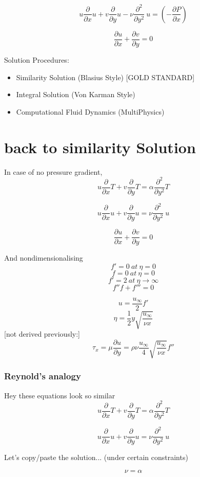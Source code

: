 \documentclass[11pt]{article}
\begin{document}
$$u  \frac{\partial}{\partial x } u + v  \frac{\partial}{\partial y} u -  \nu  \frac{\partial^2}{\partial y^2} \ u  =  ( -  \frac{\partial P}{\partial x} )$$

$$\frac{\partial u}{\partial x} + \frac{\partial v}{\partial y} = 0$$

Solution Procedures:
\begin{itemize}
\item Similarity Solution (Blasius Style) [GOLD STANDARD]
\item Integral Solution (Von Karman Style)
\item Computational Fluid Dynamics (MultiPhysics) 
\end{itemize}

\section{back to similarity Solution}

In case of no pressure gradient,
$$ u \frac{\partial}{\partial x} T + v \frac{\partial }{\partial y} T  = \alpha \frac{\partial^2 }{\partial y^2}T  $$ 

$$u  \frac{\partial}{\partial x } u + v  \frac{\partial}{\partial y} u  =  \nu  \frac{\partial^2}{\partial y^2} \ u$$

$$\frac{\partial u}{\partial x} + \frac{\partial v}{\partial y} = 0$$

And nondimensionalising 
$$f'=0\ at\ \eta=0$$
$$f=0\ at\ \eta=0$$
$$f' =2 \ at \ \eta\rightarrow \infty$$
$$f''f+f'''=0$$

$$u = \frac{u_\infty}{2} f'$$
$$\eta  = \frac{1}{2}y \sqrt{\frac{u_\infty}{\nu x}} $$
[not derived previously:]
$$\tau_x = \mu \frac{\partial u}{\partial y} = \rho \nu \frac{u_\infty}{4} \sqrt{\frac{u_\infty}{\nu x}} f''$$

\subsubsection{Reynold's analogy}

Hey these equations look so similar
$$ u \frac{\partial}{\partial x} T + v \frac{\partial }{\partial y} T  = \alpha \frac{\partial^2 }{\partial y^2}T  $$ 

$$u  \frac{\partial}{\partial x } u + v  \frac{\partial}{\partial y} u  =  \nu  \frac{\partial^2}{\partial y^2} \ u$$

Let's copy/paste the solution... (under certain constraints)

$$\nu = \alpha $$
\end{document}
